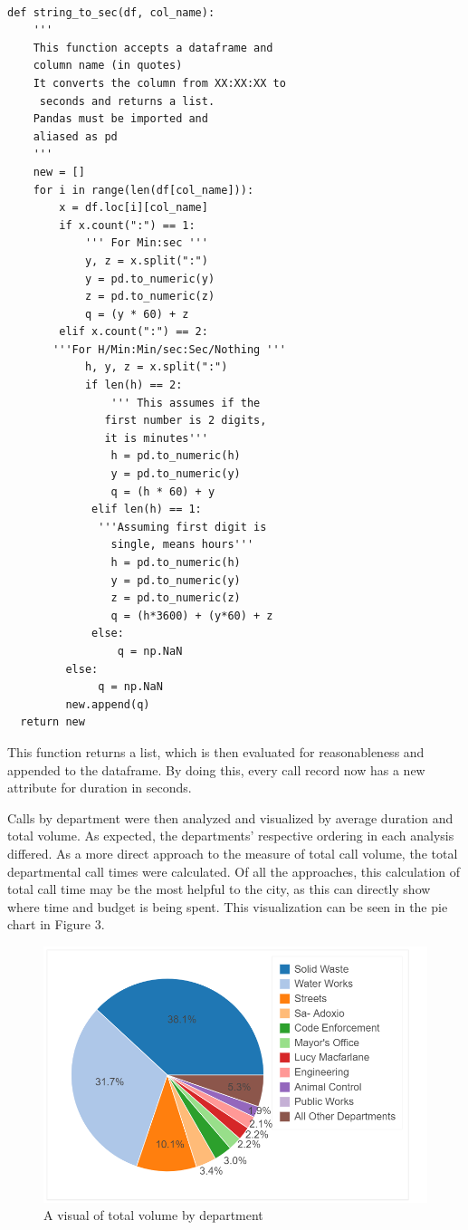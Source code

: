 \documentclass[11pt,twocolumn]{article}
\begin{document}
  \begin{Verbatim}[fontsize=\small]
  
def string_to_sec(df, col_name):
    ''' 
    This function accepts a dataframe and 
    column name (in quotes)
    It converts the column from XX:XX:XX to
     seconds and returns a list.
    Pandas must be imported and 
    aliased as pd
    '''
    new = []
    for i in range(len(df[col_name])):
        x = df.loc[i][col_name]
        if x.count(":") == 1:
            ''' For Min:sec '''
            y, z = x.split(":")
            y = pd.to_numeric(y)
            z = pd.to_numeric(z)
            q = (y * 60) + z
        elif x.count(":") == 2:
       '''For H/Min:Min/sec:Sec/Nothing '''
            h, y, z = x.split(":")
            if len(h) == 2:
                ''' This assumes if the
               first number is 2 digits,
               it is minutes'''
                h = pd.to_numeric(h)
                y = pd.to_numeric(y)
                q = (h * 60) + y
             elif len(h) == 1:
              '''Assuming first digit is 
                single, means hours'''
                h = pd.to_numeric(h)
                y = pd.to_numeric(y)
                z = pd.to_numeric(z)
                q = (h*3600) + (y*60) + z
             else:
                 q = np.NaN
         else:
              q = np.NaN
         new.append(q)
  return new
  \end{Verbatim}

This function returns a list, which is then evaluated for reasonableness and appended to the dataframe.  By doing this, every call record now has a new attribute for duration in seconds.

Calls by department were then analyzed and visualized by average duration and total volume.  As expected, the departments' respective ordering in each analysis differed.  As a more direct approach to the measure of total call volume, the total departmental call times were calculated.  Of all the approaches, this calculation of total call time may be the most helpful to the city, as this can directly show where time and budget is being spent.  This visualization can be seen in the pie chart in Figure 3.

\begin{figure}[h]
  \includegraphics[scale=0.3]{piechart.png}
  \caption{A visual of total volume by department}
 \end{figure}
\end{document}
